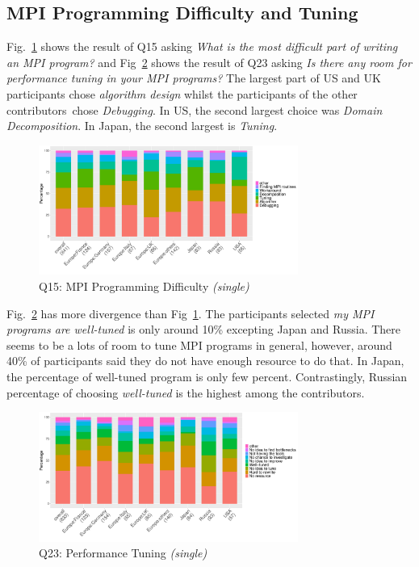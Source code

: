 \documentclass[preprint,5p,times]{elsarticle}
\def\myquote#1{{\it #1}}
\def\countries{contributors}%
\begin{document}
\subsection{MPI Programming Difficulty and Tuning}

Fig.~\ref{fig:difficulty} shows the result of Q15 asking \myquote{What is the
most difficult part of writing an MPI program?} and
Fig~\ref{fig:tuning} shows the result of Q23 asking \myquote{Is there any
room for performance tuning in your MPI programs?} The largest part
of US and UK participants chose \myquote{algorithm design} whilst the
participants of the other \countries\  chose
\myquote{Debugging}. In US, the second largest choice was
\myquote{Domain Decomposition}. In Japan, the second largest is
\myquote{Tuning}.

\begin{figure}[htb]
\begin{center}
\includegraphics[width=8.5cm]{R-scripts/Q15.pdf}
\caption{Q15: MPI Programming Difficulty {\it(single)}}
\label{fig:difficulty}
\end{center}
\end{figure}

Fig.~\ref{fig:tuning} has more divergence than
Fig~\ref{fig:difficulty}. The participants selected \myquote{my MPI
  programs are well-tuned} is only around 10\% excepting Japan and
Russia. There seems to be a lots of room to tune MPI programs in
general, however, around 40\% of participants said they do not have
enough resource to do that. In Japan, the percentage of well-tuned
program is only few percent. Contrastingly, Russian percentage of
choosing \myquote{well-tuned} is the highest among the \countries.

\begin{figure}[htb]
\begin{center}
\includegraphics[width=8.5cm]{R-scripts/Q23.pdf}
\caption{Q23: Performance Tuning {\it(single)}}
\label{fig:tuning}
\end{center}
\end{figure}
\end{document}
